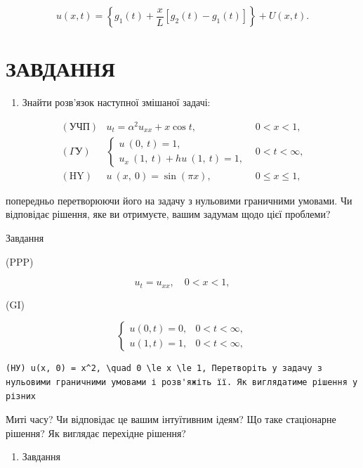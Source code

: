 \documentclass[
  ukrainian,
]{article}
\providecommand{\tightlist}{%
  \setlength{\itemsep}{0pt}\setlength{\parskip}{0pt}}
\begin{document}
\[
u(x, t) = \left\{ g_1(t) + \frac{x}{L} \left[ g_2(t) - g_1(t) \right] \right\} + U(x, t).
\]

\section{ЗАВДАННЯ}\label{ux437ux430ux432ux434ux430ux43dux43dux44f-5}

\begin{enumerate}
\def\labelenumi{\arabic{enumi}.}
\tightlist
\item
  Знайти розв'язок наступної змішаної задачі:
\end{enumerate}

\[
\begin{array}{lll} (\text{УЧП}) & u_t = \alpha^2 u_{xx} + x \cos t, & 0 < x < 1, \\ (\Gamma \text{У}) & \begin{cases} u \ (0, \ t) = 1, \\ u_x \ (1, \ t) + hu \ (1, \ t) = 1, \end{cases} & 0 < t < \infty, \\ (\text{HY}) & u \ (x, \ 0) = \sin (\pi x), & 0 \leqslant x \leqslant 1, \end{array}
\]

попередньо перетворюючи його на задачу з нульовими граничними умовами.
Чи відповідає рішення, яке ви отримуєте, вашим задумам щодо цієї
проблеми?

Завдання

(PPP)

\[
u_t = u_{xx}, \quad 0 < x < 1,
\]

(GI)

\[
\begin{cases} u(0, t) = 0, & 0 < t < \infty, \\ u(1, t) = 1, & 0 < t < \infty, \end{cases}
\]

\begin{verbatim}
(НУ) u(x, 0) = x^2, \quad 0 \le x \le 1, Перетворіть у задачу з нульовими граничними умовами і розв'яжіть її. Як виглядатиме рішення у різних
\end{verbatim}

Миті часу? Чи відповідає це вашим інтуїтивним ідеям? Що таке стаціонарне
рішення? Як виглядає перехідне рішення?

\begin{enumerate}
\def\labelenumi{\arabic{enumi}.}
\setcounter{enumi}{2}
\tightlist
\item
  Завдання
\end{enumerate}
\end{document}
